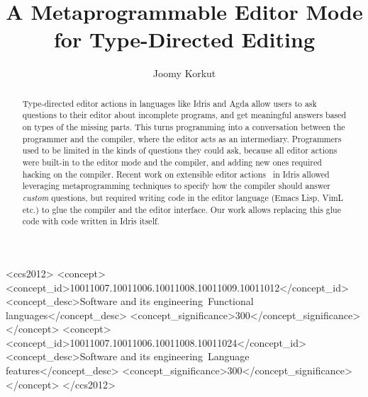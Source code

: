 \documentclass[sigplan, authordraft]{acmart}
\begin{document}
\title[A Metaprogrammable Editor Mode for Type-Directed Editing]{A Metaprogrammable Editor Mode\\ for Type-Directed Editing}

\author{Joomy Korkut}

\renewcommand{\shortauthors}{Joomy Korkut}

\begin{abstract}
  Type-directed editor actions in languages like Idris and Agda allow users to
  ask questions to their editor about incomplete programs, and get
  meaningful answers based on types of the missing parts.
  This turns programming into a conversation between the programmer and the
  compiler, where the editor acts as an intermediary.
  Programmers used to be limited in the kinds of questions they could ask,
  because all editor actions were built-in to the editor mode and the compiler,
  and adding new ones required hacking on the compiler.
  Recent work on extensible editor actions~\cite{extensible} in Idris allowed
  leveraging metaprogramming techniques to specify how the
  compiler should answer \emph{custom} questions, but required
  writing code in the editor language (Emacs Lisp, VimL etc.) to glue the
  compiler and the editor interface. Our work allows replacing this glue
  code with code written in Idris itself.
\end{abstract}

%
%
 \begin{CCSXML}
<ccs2012>
<concept>
<concept_id>10011007.10011006.10011008.10011009.10011012</concept_id>
<concept_desc>Software and its engineering~Functional languages</concept_desc>
<concept_significance>300</concept_significance>
</concept>
<concept>
<concept_id>10011007.10011006.10011008.10011024</concept_id>
<concept_desc>Software and its engineering~Language features</concept_desc>
<concept_significance>300</concept_significance>
</concept>
</ccs2012>
\end{CCSXML}


\maketitle
\end{document}
